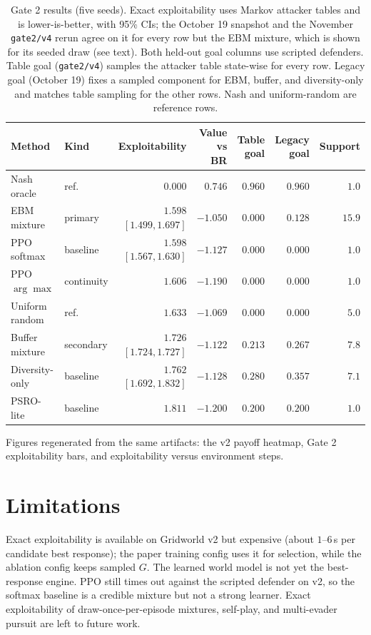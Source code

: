 \documentclass[11pt]{article}
\begin{document}
\begin{table}[t]
\centering
\caption{Gate 2 results (five seeds). Exact exploitability uses Markov attacker tables and is lower-is-better, with 95\% CIs; the October 19 snapshot and the November \texttt{gate2/v4} rerun agree on it for every row but the EBM mixture, which is shown for its seeded draw (see text). Both held-out goal columns use scripted defenders. Table goal (\texttt{gate2/v4}) samples the attacker table state-wise for every row. Legacy goal (October 19) fixes a sampled component for EBM, buffer, and diversity-only and matches table sampling for the other rows. Nash and uniform-random are reference rows.}
\label{tab:gate2}
\setlength{\tabcolsep}{3.5pt}
\begin{tabular}{llrrrrr}
\toprule
Method & Kind & Exploitability & Value vs BR & Table goal & Legacy goal & Support \\
\midrule
Nash oracle & ref. & $0.000$ & $0.746$ & $0.960$ & $0.960$ & $1.0$ \\
EBM mixture & primary & $1.598$ $[1.499,1.697]$ & $-1.050$ & $0.000$ & $0.128$ & $15.9$ \\
PPO softmax & baseline & $1.598$ $[1.567,1.630]$ & $-1.127$ & $0.000$ & $0.000$ & $1.0$ \\
PPO $\arg\max$ & continuity & $1.606$ & $-1.190$ & $0.000$ & $0.000$ & $1.0$ \\
Uniform random & ref. & $1.633$ & $-1.069$ & $0.000$ & $0.000$ & $5.0$ \\
Buffer mixture & secondary & $1.726$ $[1.724,1.727]$ & $-1.122$ & $0.213$ & $0.267$ & $7.8$ \\
Diversity-only & baseline & $1.762$ $[1.692,1.832]$ & $-1.128$ & $0.280$ & $0.357$ & $7.1$ \\
PSRO-lite & baseline & $1.811$ & $-1.200$ & $0.200$ & $0.200$ & $1.0$ \\
\bottomrule
\end{tabular}
\end{table}

Figures regenerated from the same artifacts: the v2 payoff heatmap, Gate 2 exploitability bars, and exploitability versus environment steps.

\section{Limitations}

Exact exploitability is available on Gridworld v2 but expensive (about $1$--$6$\,s per candidate best response); the paper training config uses it for selection, while the ablation config keeps sampled $G$.
The learned world model is not yet the best-response engine.
PPO still times out against the scripted defender on v2, so the softmax baseline is a credible mixture but not a strong learner.
Exact exploitability of draw-once-per-episode mixtures, self-play, and multi-evader pursuit are left to future work.
\end{document}
